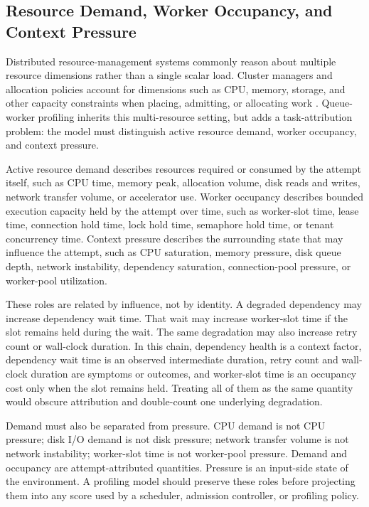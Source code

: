 \subsection{Resource Demand, Worker Occupancy, and Context Pressure}
\label{sec:background-demand-occupancy-pressure}

Distributed resource-management systems commonly reason about multiple resource
dimensions rather than a single scalar load. Cluster managers and allocation
policies account for dimensions such as CPU, memory, storage, and other capacity
constraints when placing, admitting, or allocating work
\cite{verma2015borg,ghodsi2011drf}. Queue-worker profiling inherits this
multi-resource setting, but adds a task-attribution problem: the model must
distinguish active resource demand, worker occupancy, and context pressure.

Active resource demand describes resources required or consumed by the attempt
itself, such as CPU time, memory peak, allocation volume, disk reads and writes,
network transfer volume, or accelerator use. Worker occupancy describes bounded
execution capacity held by the attempt over time, such as worker-slot time,
lease time, connection hold time, lock hold time, semaphore hold time, or tenant
concurrency time. Context pressure describes the surrounding state that may
influence the attempt, such as CPU saturation, memory pressure, disk queue depth,
network instability, dependency saturation, connection-pool pressure, or
worker-pool utilization.

These roles are related by influence, not by identity. A degraded dependency may
increase dependency wait time. That wait may increase worker-slot time if the
slot remains held during the wait. The same degradation may also increase retry
count or wall-clock duration. In this chain, dependency health is a context
factor, dependency wait time is an observed intermediate duration, retry count
and wall-clock duration are symptoms or outcomes, and worker-slot time is an
occupancy cost only when the slot remains held. Treating all of them as the same
quantity would obscure attribution and double-count one underlying degradation.

Demand must also be separated from pressure. CPU demand is not CPU pressure;
disk I/O demand is not disk pressure; network transfer volume is not network
instability; worker-slot time is not worker-pool pressure. Demand and occupancy
are attempt-attributed quantities. Pressure is an input-side state of the
environment. A profiling model should preserve these roles before projecting
them into any score used by a scheduler, admission controller, or profiling
policy.

